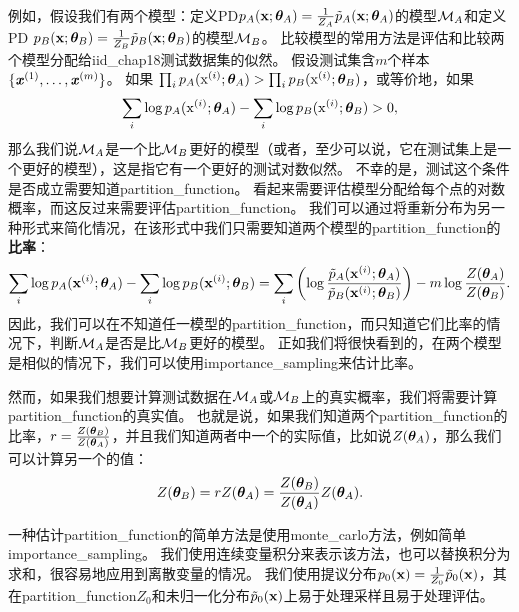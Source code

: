 例如，假设我们有两个模型：定义\gls{PD}$p_A(\mathbf{x}; \boldsymbol{\theta}_A)= \frac{1}{Z_A} \tilde{p}_A(\mathbf{x}; \boldsymbol{\theta}_A)$的模型$\mathcal{M}_A$和定义\gls{PD} $p_B(\mathbf{x}; \boldsymbol{\theta}_B)= \frac{1}{Z_B} \tilde{p}_B(\mathbf{x}; \boldsymbol{\theta}_B)$的模型$\mathcal{M}_B$。
比较模型的常用方法是评估和比较两个模型分配给\gls{iid_chap18}测试数据集的似然。
假设测试集含$m$个样本$\{ \boldsymbol{\mathit{x}}^{(1)}, \dots, \boldsymbol{\mathit{x}}^{(m)} \}$。
如果 $\prod_i p_A ( \mathrm{x}^{(i)}; \boldsymbol{\theta}_A) > \prod_i p_B( \mathrm{x}^{(i)}; \boldsymbol{\theta}_B)$，或等价地，如果
\begin{equation}
\label{eq:18.38}
	\sum_i \log p_A (\mathrm{x}^{(i)}; \boldsymbol{\theta}_A) - \sum_i \log p_B(\mathrm{x}^{(i)}; \boldsymbol{\theta}_B) > 0,
\end{equation}
那么我们说$\mathcal{M}_A$是一个比$\mathcal{M}_B$更好的模型（或者，至少可以说，它在测试集上是一个更好的模型），这是指它有一个更好的测试对数似然。
不幸的是，测试这个条件是否成立需要知道\gls{partition_function}。
看起来需要评估模型分配给每个点的对数概率，而这反过来需要评估\gls{partition_function}。
我们可以通过将重新分布为另一种形式来简化情况，在该形式中我们只需要知道两个模型的\gls{partition_function}的\textbf{比率}：
\begin{equation}
\label{eq:18.39}
	\sum_i \log p_A(\mathbf{x}^{(i)}; \boldsymbol{\theta}_A) - \sum_i \log p_B(\mathbf{x}^{(i)}; \boldsymbol{\theta}_B) =
	\sum_i \left(  \log \frac{ \tilde{p}_A(\mathbf{x}^{(i)}; \boldsymbol{\theta}_A) }{ \tilde{p}_B(\mathbf{x}^{(i)}; \boldsymbol{\theta}_B) } \right)  - m\log \frac{Z(\boldsymbol{\theta}_A)}{ Z(\boldsymbol{\theta}_B) }.
\end{equation}
因此，我们可以在不知道任一模型的\gls{partition_function}，而只知道它们比率的情况下，判断$\mathcal{M}_A$是否是比$\mathcal{M}_B$更好的模型。
正如我们将很快看到的，在两个模型是相似的情况下，我们可以使用\gls{importance_sampling}来估计比率。


然而，如果我们想要计算测试数据在$\mathcal{M}_A$或$\mathcal{M}_B$上的真实概率，我们将需要计算\gls{partition_function}的真实值。
也就是说，如果我们知道两个\gls{partition_function}的比率，$r = \frac{Z(\boldsymbol{\theta}_B)}{ Z(\boldsymbol{\theta}_A) }$，并且我们知道两者中一个的实际值，比如说$Z(\boldsymbol{\theta}_A)$，那么我们可以计算另一个的值：
\begin{equation}
	Z(\boldsymbol{\theta}_B) = r Z(\boldsymbol{\theta}_A) = \frac{ Z(\boldsymbol{\theta}_B) }{ Z(\boldsymbol{\theta}_A) } Z(\boldsymbol{\theta}_A).
\end{equation}


一种估计\gls{partition_function}的简单方法是使用\gls{monte_carlo}方法，例如简单\gls{importance_sampling}。
我们使用连续变量积分来表示该方法，也可以替换积分为求和，很容易地应用到离散变量的情况。
我们使用提议分布$p_0(\mathbf{x}) = \frac{1}{Z_0} \tilde{p}_0( \mathbf{x})$，其在\gls{partition_function}$Z_0$和未归一化分布$\tilde{p}_0(\mathbf{x})$上易于处理采样且易于处理评估。

